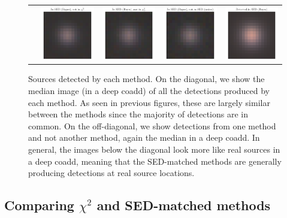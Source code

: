 \documentclass[11pt,letterpaper,linenumbers]{aastex63}
\begin{document}
\begin{figure}[p!]
\begin{center}
\begin{tabular}{@{}c@{}c@{}c@{}c@{}c@{}}
      \raisebox{0.05\textwidth}{\rotatebox[origin=l]{90}{SED (Bayes)}} &
      \includegraphics[height=0.2\textwidth]{unmatched-sed-mix-chisq-9} &
      \includegraphics[height=0.2\textwidth]{unmatched-sed-mix-chipos-9} &
      \includegraphics[height=0.2\textwidth]{unmatched-sed-mix-sed-union-9} &
      \includegraphics[height=0.2\textwidth]{median-sed-mix}
    \end{tabular}
  \end{center}
  \caption{Sources detected by each method.  On the diagonal, we show
    the median image (in a deep coadd) of all the detections produced
    by each method.  As seen in previous figures, these are largely
    similar between the methods since the majority of detections are
    in common.
    On the off-diagonal, we show detections from one method and not another
    method, again the median in a deep coadd.  In general, the images below
    the diagonal look more like real sources in a deep coadd, meaning that the
    SED-matched methods are generally producing detections at real source
    locations.
    \label{fig:comp-median-image}
    }
\end{figure}




\subsection{Comparing $\chi^2$ and SED-matched methods}
\end{document}
